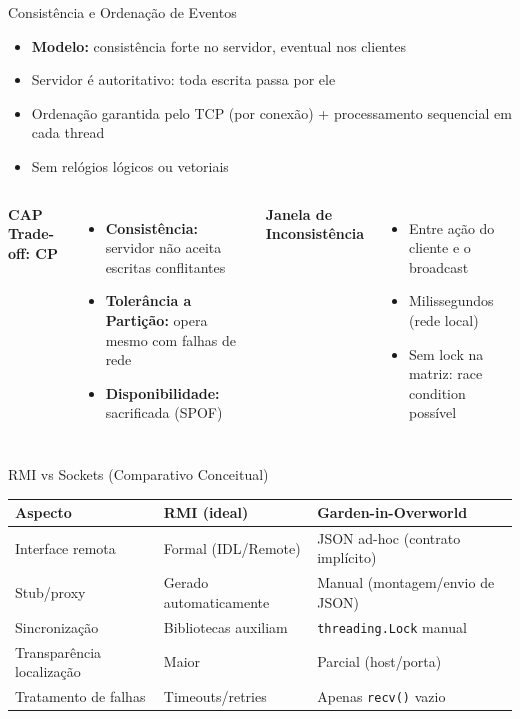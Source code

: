 \documentclass[aspectratio=169]{beamer}
\begin{document}
\begin{frame}{Consist\^encia e Ordena\c{c}\~ao de Eventos}
  \begin{itemize}
    \item \textbf{Modelo:} consist\^encia forte no servidor, eventual nos clientes
    \item Servidor \'e autoritativo: toda escrita passa por ele
    \item Ordena\c{c}\~ao garantida pelo TCP (por conex\~ao) + processamento sequencial em cada thread
    \item Sem rel\'ogios l\'ogicos ou vetoriais
  \end{itemize}

  \vfill
  \begin{columns}
    \textbf{CAP Trade-off: CP}
    \begin{itemize}
      \item \textbf{Consist\^encia:} servidor n\~ao aceita escritas conflitantes
      \item \textbf{Toler\^ancia a Parti\c{c}\~ao:} opera mesmo com falhas de rede
      \item \textbf{Disponibilidade:} sacrificada (SPOF)
    \end{itemize}
    \textbf{Janela de Inconsist\^encia}
    \begin{itemize}
      \item Entre a\c{c}\~ao do cliente e o broadcast
      \item Milissegundos (rede local)
      \item Sem lock na matriz: race condition poss\'ivel
    \end{itemize}
  \end{columns}
\end{frame}

\begin{frame}{RMI vs Sockets (Comparativo Conceitual)}
  \footnotesize
  \begin{tabular}{>{\raggedright\arraybackslash}p{3cm}>{\raggedright\arraybackslash}p{4.5cm}>{\raggedright\arraybackslash}p{4.5cm}}
    \toprule
    \textbf{Aspecto} & \textbf{RMI (ideal)} & \textbf{Garden-in-Overworld} \\
    \midrule
    Interface remota & Formal (IDL/Remote) & JSON ad-hoc (contrato impl\'icito) \\
    Stub/proxy & Gerado automaticamente & Manual (montagem/envio de JSON) \\
    Sincroniza\c{c}\~ao & Bibliotecas auxiliam & \texttt{threading.Lock} manual \\
    Transpar\^encia localiza\c{c}\~ao & Maior & Parcial (host/porta) \\
    Tratamento de falhas & Timeouts/retries & Apenas \texttt{recv()} vazio \\
    \bottomrule
  \end{tabular}
\end{frame}
\end{document}
